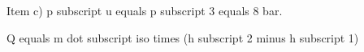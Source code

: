 Item c) p subscript u equals p subscript 3 equals 8 bar.

Q equals m dot subscript iso times (h subscript 2 minus h subscript 1)